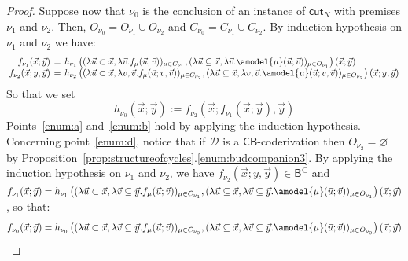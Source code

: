 \documentclass[manuscript,screen]{acmart}
\newcommand{\dfn}{:=}
\renewcommand{\emptyset}{\varnothing}
\theoremstyle{definition}
\theoremstyle{remark}
\newcommand{\permpref}{\subset}
\newcommand{\n}{N}
\newcommand{\model}[1]{\denot{#1}}
\newcommand{\denot}[1]{f_{#1}}
\newcommand{\bc}{\mathsf{B}}
\newcommand{\bcwfpo}[1]{\bc^{#1}}
\newcommand{\bcpp}{\bcwfpo{\permpref}}
\newcommand{\der}{\mathcal{D}}
\newcommand{\close}[1]{{C}_{#1}}
\newcommand{\open}[1]{{O}_{#1}}
\newcommand{\hnu}{\nu_0}
\newcommand{\cut}{\mathsf{cut}}
\newcommand{\cyclic}{\mathsf{C}}
\newcommand{\cbc}{\cyclic\bc}
\begin{document}
\begin{proof}
Suppose now that $\hnu$ is the conclusion of an instance of $\cut_{\n}$ with premises $\nu_1$ and $\nu_2$.  Then, $\open{\hnu}=\open{\nu_1}\cup \open{\nu_2}$ and  $\close{\hnu}=\close{\nu_1}\cup \close{\nu_2}$.
By induction hypothesis on $\nu_1$ and $\nu_2$ we have:
\[
\arraycolsep=2pt
\begin{array}{rcl}
     \model{{\nu_1}}(\vec{x}; \vec{y})
    & =&
     h_{\nu_1}\left(( \lambda \vec{u}\subset \vec{x}, \lambda \vec v. \model{{\mu}}(\vec{u};\vec v))_{\mu \in \close{\nu_1}}, ( \lambda \vec{u}\subseteq \vec{x}, \lambda \vec v. \amodel{{\mu}}(\vec{u};\vec v))_{\mu \in  \open{\nu_1}}\right)(\vec{x}; \vec{y})
\\
       \model{{\nu_2}}(\vec{x};y, \vec{y})  &=& 
       h_{\nu_2}\left(( \lambda \vec{u}\subset \vec{x}, \lambda v,\vec v. \model{{\mu}}(\vec{u};v,\vec v))_{\mu \in \close{\nu_2}}, ( \lambda \vec{u}\subseteq \vec{x}, \lambda v,\vec v. \amodel{{\mu}}(\vec{u};v,\vec v))_{\mu \in \open{\nu_2}}\right)(\vec{x}; y,\vec{y})
\end{array}
\]
So that we set
\begin{equation*}
    h_{{\hnu}}(\vec{x}; \vec{y})\dfn \model{{\nu_2}}(\vec{x}; \model{{\nu_1}}(\vec{x}; \vec{y}), \vec{y}) 
\end{equation*}
Points~\ref{enum:a} and~\ref{enum:b}  hold by applying the induction hypothesis. Concerning point~\ref{enum:d}, notice that   if $\der$ is a $\cbc$-coderivation then   $\open{\nu_2}= \emptyset$ by Proposition~\ref{prop:structureofcycles}.\ref{enum:budcompanion3}.  By applying the induction hypothesis on $\nu_1$ and $\nu_2$, we have $ \model{{\nu_2}}(\vec{x};y, \vec{y})\in \bcpp$ and   $ \model{{\nu_1}}(\vec{x}; \vec{y})=h_{\nu_1}\left(( \lambda \vec{u}\subset \vec{x}, \lambda \vec v\subseteq \vec y. \model{{\mu}}(\vec{u};\vec v))_{\mu \in \close{\nu_1}},( \lambda \vec{u}\subseteq \vec{x}, \lambda \vec v\subseteq \vec y. \amodel{{\mu}}(\vec{u};\vec v))_{\mu \in  \open{\nu_1}}\right)(\vec{x}; \vec{y})$, so that:
\begin{equation*}
     \model{{\hnu}}(\vec{x}; \vec{y})=h_{\hnu}\left(( \lambda \vec{u}\subset \vec{x}, \lambda \vec v\subseteq \vec y. \model{{\mu}}(\vec{u};\vec v))_{\mu \in \close{\hnu}},( \lambda \vec{u}\subseteq \vec{x}, \lambda \vec v\subseteq \vec y. \amodel{{\mu}}(\vec{u};\vec v))_{\mu \in \open{\hnu}}\right)(\vec{x}; \vec{y})
\end{equation*}



\end{proof}
\end{document}
